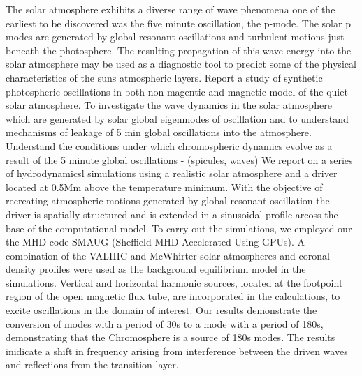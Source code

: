 \documentclass{aa}
\begin{document}
  \abstract
   { The solar atmosphere exhibits a diverse range of wave phenomena one of the earliest to be discovered was the five minute oscillation, the p-mode. The solar p modes are generated by global resonant oscillations and turbulent motions just beneath the photosphere. The resulting propagation of this wave energy into the solar atmosphere may be used as a diagnostic tool to predict some of the physical characteristics of the  suns atmospheric layers. Report a study of synthetic photospheric oscillations in both non-magentic and magnetic  model of the quiet solar atmosphere.}
   {To investigate the wave dynamics in the solar atmosphere which are generated by solar global eigenmodes of oscillation and to understand mechanisms of leakage of 5 min global oscillations into the atmosphere. Understand the conditions under which chromospheric dynamics evolve as a result of the 5 minute global oscillations - (spicules, waves)
}
   {  We report on a series of hydrodynamicsl simulations using a realistic solar atmosphere and a driver located at 0.5Mm above the temperature minimum. With the objective of recreating atmospheric motions generated by global resonant oscillation the driver is spatially structured and is extended in a sinusoidal profile arcoss the base of the computational model.  To carry out the simulations, we employed our the MHD code SMAUG (Sheffield MHD Accelerated Using GPUs). A combination of the VALIIIC and McWhirter solar atmospheres and coronal density profiles were used as the background equilibrium
model in the simulations. Vertical and horizontal harmonic sources, located at the footpoint region of the open magnetic flux tube, are incorporated in the calculations, to excite oscillations in the domain of interest.}
   {Our results demonstrate the conversion of modes with a period of 30s to a mode with a period of 180s, demonstrating that the Chromosphere is a source of 180s modes. The results inidicate a shift in frequency arising from interference between the driven waves and reflections from the transition layer.}


   \maketitle
%
\end{document}
